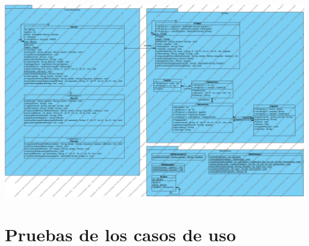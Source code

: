 \documentclass[a4paper,11pt,oneside]{article}
\begin{document}
\includegraphics[width=1 \textwidth]{img/ddc_Servidor.png}\\[1cm]

\clearpage
\section{Pruebas de los casos de uso}
\end{document}
